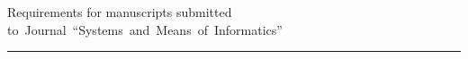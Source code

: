 \def\stat{prav-eng}


{%


\vspace*{-25pt} %


\raggedleft\large \bf%


Requirements for manuscripts submitted to~Journal~``Systems~and~Means~of~Informatics''%




\vskip 5pt


    \hrule


    \par




}





\def\rightmark{\ }


\def\leftmark{\ }





\def\tit{\ }





\def\aut{\ }





\def\auf{\ }





\def\leftkol{\ } %





\def\rightkol{\ } %





\titele{\tit}{\aut}{\auf}{\leftkol}{\rightkol}





\vspace*{-48pt}


